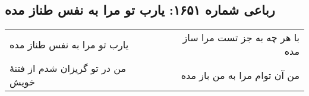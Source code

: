 \begin{center}
\section*{رباعی شماره ۱۶۵۱: یارب تو مرا به نفس طناز مده}
\label{sec:1651}
\begin{longtable}{l p{0.5cm} r}
یارب تو مرا به نفس طناز مده
&&
با هر چه به جز تست مرا ساز مده
\\
من در تو گریزان شدم از فتنهٔ خویش
&&
من آن توام مرا به من باز مده
\\
\end{longtable}
\end{center}
